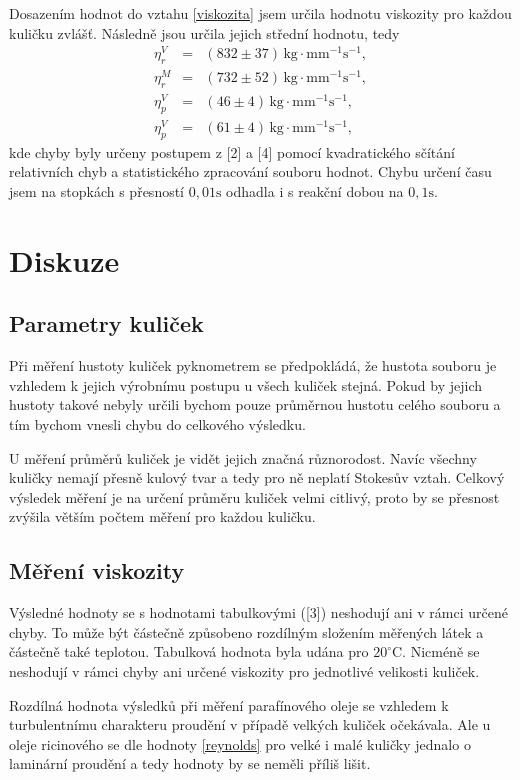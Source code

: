 \documentclass[a4paper,12pt]{article}
\begin{document}
Dosazením hodnot do vztahu \ref{viskozita} jsem určila hodnotu viskozity pro každou 
kuličku zvlášť. Následně jsou určila jejich střední hodnotu, tedy 
\begin{eqnarray}
\nonumber \eta_{r}^{V} &=& (832 \pm 37 ) \, \mathrm{kg \cdot mm^{-1} s^{-1}},\\
\nonumber \eta_{r}^{M} &=& (732 \pm 52 ) \, \mathrm{kg \cdot mm^{-1} s^{-1}},\\
\nonumber \eta_{p}^{V} &=& (46 \pm 4 ) \, \mathrm{kg \cdot mm^{-1} s^{-1}},\\
\nonumber \eta_{p}^{V} &=& (61 \pm 4 ) \, \mathrm{kg \cdot mm^{-1} s^{-1}},
\end{eqnarray}
kde chyby byly určeny postupem z [2] a [4] pomocí kvadratického sčítání relativních chyb a statistického 
zpracování souboru hodnot. Chybu určení času jsem na stopkách s přesností $0,01 \mathrm{s}$ odhadla 
i s reakční dobou na $0,1 \mathrm{s}$.

\section{Diskuze}
\subsection{Parametry kuliček}
Při měření hustoty kuliček pyknometrem se předpokládá, že hustota
souboru je vzhledem k jejich výrobnímu postupu u všech kuliček stejná.
Pokud by jejich hustoty takové nebyly určili bychom pouze průměrnou hustotu
celého souboru a tím bychom vnesli chybu do celkového výsledku.

U měření průměrů kuliček je vidět jejich značná různorodost. Navíc
všechny kuličky nemají přesně kulový tvar a tedy pro ně neplatí Stokesův
vztah. Celkový výsledek měření je na určení průměru kuliček velmi citlivý,
proto by se přesnost zvýšila větším počtem měření pro každou kuličku.

\subsection{Měření viskozity}
Výsledné hodnoty se s hodnotami tabulkovými ([3]) neshodují ani v rámci
určené chyby. To může být částečně způsobeno rozdílným složením měřených látek a
částečně také teplotou. Tabulková hodnota byla udána pro $20^{\circ}\mathrm{C}$. 
Nicméně se neshodují v rámci chyby ani určené viskozity pro jednotlivé velikosti 
kuliček. 

Rozdílná hodnota výsledků při měření parafínového oleje se vzhledem k turbulentnímu 
charakteru proudění v případě velkých kuliček očekávala. Ale u oleje 
ricinového se dle hodnoty \ref{reynolds} pro velké i malé kuličky  
jednalo o laminární proudění a tedy hodnoty by se neměli příliš lišit.
 
\end{document}
